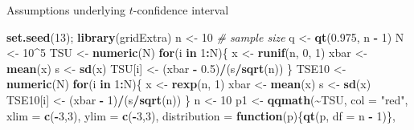 \documentclass[
  ignorenonframetext,
]{beamer}
\newenvironment{Shaded}{\begin{snugshade}}{\end{snugshade}}
\newcommand{\AttributeTok}[1]{\textcolor[rgb]{0.13,0.29,0.53}{#1}}
\newcommand{\CommentTok}[1]{\textcolor[rgb]{0.56,0.35,0.01}{\textit{#1}}}
\newcommand{\ControlFlowTok}[1]{\textcolor[rgb]{0.13,0.29,0.53}{\textbf{#1}}}
\newcommand{\DecValTok}[1]{\textcolor[rgb]{0.00,0.00,0.81}{#1}}
\newcommand{\FloatTok}[1]{\textcolor[rgb]{0.00,0.00,0.81}{#1}}
\newcommand{\FunctionTok}[1]{\textcolor[rgb]{0.13,0.29,0.53}{\textbf{#1}}}
\newcommand{\NormalTok}[1]{#1}
\newcommand{\OtherTok}[1]{\textcolor[rgb]{0.56,0.35,0.01}{#1}}
\newcommand{\SpecialCharTok}[1]{\textcolor[rgb]{0.81,0.36,0.00}{\textbf{#1}}}
\newcommand{\StringTok}[1]{\textcolor[rgb]{0.31,0.60,0.02}{#1}}
\begin{document}
\begin{frame}[fragile]{Assumptions underlying \(t\)-confidence interval}
\protect\hypertarget{assumptions-underlying-t-confidence-interval-5}{}
\tiny

\begin{Shaded}
\begin{Highlighting}[]
\FunctionTok{set.seed}\NormalTok{(}\DecValTok{13}\NormalTok{); }\FunctionTok{library}\NormalTok{(gridExtra)}
\NormalTok{n }\OtherTok{\textless{}{-}} \DecValTok{10}           \CommentTok{\# sample size}
\NormalTok{q }\OtherTok{\textless{}{-}} \FunctionTok{qt}\NormalTok{(}\FloatTok{0.975}\NormalTok{, n }\SpecialCharTok{{-}} \DecValTok{1}\NormalTok{)}
\NormalTok{N }\OtherTok{\textless{}{-}} \DecValTok{10}\SpecialCharTok{\^{}}\DecValTok{5}
\NormalTok{TSU }\OtherTok{\textless{}{-}} \FunctionTok{numeric}\NormalTok{(N)}
\ControlFlowTok{for}\NormalTok{(i }\ControlFlowTok{in} \DecValTok{1}\SpecialCharTok{:}\NormalTok{N)\{}
\NormalTok{  x }\OtherTok{\textless{}{-}} \FunctionTok{runif}\NormalTok{(n, }\DecValTok{0}\NormalTok{, }\DecValTok{1}\NormalTok{)}
\NormalTok{  xbar }\OtherTok{\textless{}{-}} \FunctionTok{mean}\NormalTok{(x)}
\NormalTok{  s }\OtherTok{\textless{}{-}} \FunctionTok{sd}\NormalTok{(x)}
\NormalTok{  TSU[i] }\OtherTok{\textless{}{-}}\NormalTok{ (xbar }\SpecialCharTok{{-}} \FloatTok{0.5}\NormalTok{)}\SpecialCharTok{/}\NormalTok{(s}\SpecialCharTok{/}\FunctionTok{sqrt}\NormalTok{(n))}
\NormalTok{\}}
\NormalTok{TSE10 }\OtherTok{\textless{}{-}} \FunctionTok{numeric}\NormalTok{(N)}
\ControlFlowTok{for}\NormalTok{(i }\ControlFlowTok{in} \DecValTok{1}\SpecialCharTok{:}\NormalTok{N)\{}
\NormalTok{  x }\OtherTok{\textless{}{-}} \FunctionTok{rexp}\NormalTok{(n, }\DecValTok{1}\NormalTok{)}
\NormalTok{  xbar }\OtherTok{\textless{}{-}} \FunctionTok{mean}\NormalTok{(x)}
\NormalTok{  s }\OtherTok{\textless{}{-}} \FunctionTok{sd}\NormalTok{(x)}
\NormalTok{  TSE10[i] }\OtherTok{\textless{}{-}}\NormalTok{ (xbar }\SpecialCharTok{{-}} \DecValTok{1}\NormalTok{)}\SpecialCharTok{/}\NormalTok{(s}\SpecialCharTok{/}\FunctionTok{sqrt}\NormalTok{(n))}
\NormalTok{\}}
\NormalTok{n }\OtherTok{\textless{}{-}} \DecValTok{10}
\NormalTok{p1 }\OtherTok{\textless{}{-}} \FunctionTok{qqmath}\NormalTok{(}\SpecialCharTok{\textasciitilde{}}\NormalTok{TSU, }\AttributeTok{col =} \StringTok{"red"}\NormalTok{, }\AttributeTok{xlim =} \FunctionTok{c}\NormalTok{(}\SpecialCharTok{{-}}\DecValTok{3}\NormalTok{,}\DecValTok{3}\NormalTok{), }\AttributeTok{ylim =} \FunctionTok{c}\NormalTok{(}\SpecialCharTok{{-}}\DecValTok{3}\NormalTok{,}\DecValTok{3}\NormalTok{), }\AttributeTok{distribution =} \ControlFlowTok{function}\NormalTok{(p)\{}\FunctionTok{qt}\NormalTok{(p, }\AttributeTok{df =}\NormalTok{ n }\SpecialCharTok{{-}} \DecValTok{1}\NormalTok{)\}, }

\end{Highlighting}
\end{Shaded}
\end{frame}
\end{document}
